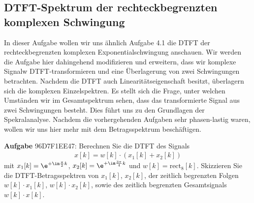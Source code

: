 \subsection{DTFT-Spektrum der rechteckbegrenzten komplexen Schwingung}
\label{sec:96D7F1EE47}
\begin{Ziel}
In dieser Aufgabe wollen wir uns ähnlich Aufgabe 4.1
die DTFT der rechteckbegrenzten komplexen Exponentialschwingung anschauen.
Wir werden die Aufgabe hier dahingehend modifizieren und erweitern, dass
wir komplexe Signalw DTFT-transformieren und eine Überlagerung von zwei Schwingungen
betrachten. Nachdem die DTFT auch Linearitätseigenschaft besitzt, überlagern
sich die komplexen Einzelspektren. Es stellt sich die Frage, unter welchen
Umständen wir im Gesamtspektrum sehen, dass das transformierte Signal aus
zwei Schwingungen besteht. Dies führt uns zu den Grundlagen der Spekralanalyse.
Nachdem die vorhergehenden Aufgaben sehr phasen-lastig waren, wollen wir
uns hier mehr mit dem Betragsspektrum beschäftigen.
\end{Ziel}
\textbf{Aufgabe} {\tiny 96D7F1EE47}:
Berechnen Sie die DTFT des Signals
\begin{align}
x[k] = w[k] \cdot
\left(
x_1[k] + x_2[k]
\right)
\end{align}
mit $x_1[k] = \e^{+\im\frac{\pi}{2} k}$, $x_2[k] = \e^{+\im\frac{3\pi}{4} k}$
und $w[k] = \mathrm{rect}_8[k]$.
%
Skizzieren Sie die DTFT-Betragsspektren von $x_1[k]$, $x_2[k]$,
der zeitlich begrenzten Folgen $w[k] \cdot x_1[k]$, $w[k] \cdot x_2[k]$, sowie
des zeitlich begrenzten Gesamtsignals $w[k] \cdot x[k]$.


